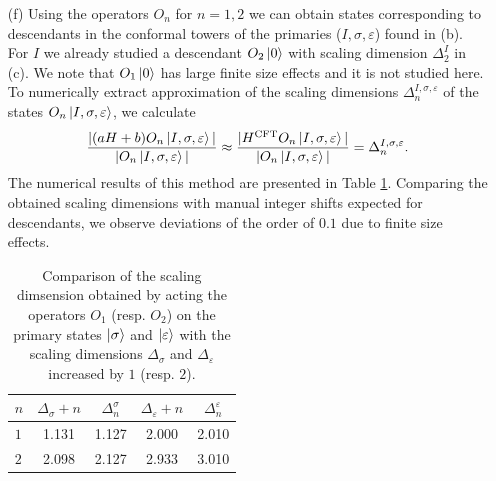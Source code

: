 \documentclass[10pt, a4paper]{article}
\begin{document}
{\begin{enumerate}
\begin{table}
      \caption{Calculation of the approximative critical exponents of the 1+1D TFIM phase transition using the approximative scaling dimensions $\Delta_{\sigma}$ and $\Delta_{\varepsilon}$ for two finite system size $L=16$ and $L=18$. The exact values for these exponents are known and compared with the approximative results to show an improvement of the agreement with increasing system size. The expression in terms of primary scaling dimensions and exact values for these exponents can be found at \cite{crit_exp}. \label{crit_exp}}
  \end{table}
  \item[(f)] Using the operators $O_n$ for $n =1, 2$ we can obtain states corresponding to descendants in the conformal towers of the primaries ($I, \sigma, \varepsilon$) found in (b). For $I$ we already studied a descendant $O_2\ket{0}$ with scaling dimension $\Delta_2^I$ in (c). We note that $O_1\ket{0}$ has large finite size effects and it is not studied here. To numerically extract approximation of the scaling dimensions $\Delta_{n}^{I, \sigma, \varepsilon}$ of the states $O_n \ket{I, \sigma, \varepsilon}$, we calculate
  \begin{align*}
     \frac{|(a H + b) O_n \ket{I, \sigma, \varepsilon}|}{|O_n \ket{I, \sigma, \varepsilon}|} \approx \frac{| H^{\rm CFT} O_n \ket{I, \sigma, \varepsilon}|}{|O_n \ket{I, \sigma, \varepsilon}|} = \Delta_{n}^{I, \sigma, \varepsilon}. 
  \end{align*}
  The numerical results of this method are presented in Table \ref{des}. Comparing the obtained scaling dimensions with manual integer shifts expected for descendants, we observe deviations of the order of $0.1$ due to finite size effects. 
  \begin{table}
    \centering
    \begin{tabular}{lcccc}
      \toprule
            $n$ & $\Delta_\sigma + n$ & $\Delta_{n}^\sigma$ & $\Delta_\varepsilon + n$ & $\Delta_{n}^\varepsilon$ \\
      \midrule
      $1$ & 1.131 & 1.127 & 2.000 & 2.010 \\
      $2$ & 2.098 & 2.127 & 2.933 & 3.010 \\
      \bottomrule
      \end{tabular}
    \caption{Comparison of the scaling dimsension obtained by acting the operators $O_1$  (resp. $O_2$) on the primary states $\ket{\sigma}$ and $\ket{\varepsilon}$ with the scaling dimensions $\Delta_\sigma$ and $\Delta_\varepsilon$ increased by $1$ (resp. $2$). \label{des}}
  \end{table}

\end{enumerate}}
\end{document}
